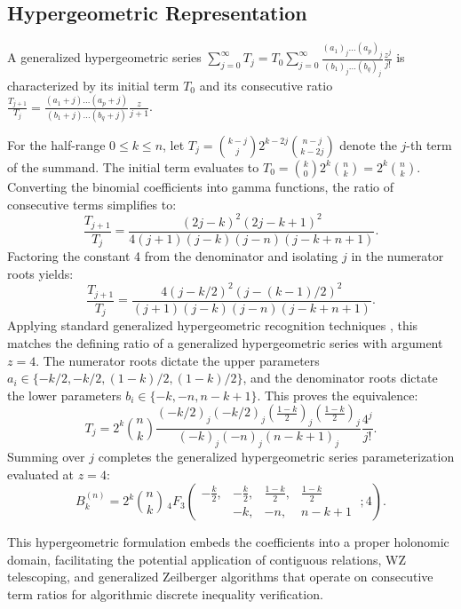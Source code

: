 \documentclass[11pt]{article}
\begin{document}
\subsection{Hypergeometric Representation}

A generalized hypergeometric series $\sum_{j=0}^\infty T_j = T_0 \sum_{j=0}^\infty \frac{(a_1)_j \dots (a_p)_j}{(b_1)_j \dots (b_q)_j} \frac{z^j}{j!}$ is characterized by its initial term $T_0$ and its consecutive ratio $\frac{T_{j+1}}{T_j} = \frac{(a_1+j)\dots(a_p+j)}{(b_1+j)\dots(b_q+j)}\frac{z}{j+1}$.

For the half-range $0 \le k \le n$, let $T_j = \binom{k-j}{j} 2^{k-2j} \binom{n-j}{k-2j}$ denote the $j$-th term of the summand. The initial term evaluates to $T_0 = \binom{k}{0} 2^k \binom{n}{k} = 2^k \binom{n}{k}$. Converting the binomial coefficients into gamma functions, the ratio of consecutive terms simplifies to:
\begin{equation*}
\frac{T_{j+1}}{T_j} = \frac{(2j-k)^2(2j-k+1)^2}{4(j+1)(j-k)(j-n)(j-k+n+1)}.
\end{equation*}
Factoring the constant 4 from the denominator and isolating $j$ in the numerator roots yields:
\begin{equation*}
\frac{T_{j+1}}{T_j} = \frac{4(j - k/2)^2 (j - (k-1)/2)^2}{(j+1)(j-k)(j-n)(j-k+n+1)}.
\end{equation*}
Applying standard generalized hypergeometric recognition techniques \cite{Slater1966, Petkovsek1996}, this matches the defining ratio of a generalized hypergeometric series with argument $z=4$. The numerator roots dictate the upper parameters $a_i \in \{-k/2, -k/2, (1-k)/2, (1-k)/2\}$, and the denominator roots dictate the lower parameters $b_i \in \{-k, -n, n-k+1\}$. This proves the equivalence:
\begin{equation*}
T_j = 2^k \binom{n}{k} \frac{(-k/2)_j (-k/2)_j (\frac{1-k}{2})_j (\frac{1-k}{2})_j}{(-k)_j (-n)_j (n-k+1)_j} \frac{4^j}{j!}.
\end{equation*}
Summing over $j$ completes the generalized hypergeometric series parameterization evaluated at $z=4$:
\begin{equation}
B_k^{(n)} = 2^k\binom{n}{k} \, {}_4F_3\left( 
\begin{matrix}
-\frac{k}{2}, & -\frac{k}{2}, & \frac{1-k}{2}, & \frac{1-k}{2} \\
 & -k, & -n, & n-k+1
\end{matrix}
\;; 4 \right).
\end{equation}

This hypergeometric formulation embeds the coefficients into a proper holonomic domain, facilitating the potential application of contiguous relations, WZ telescoping, and generalized Zeilberger algorithms that operate on consecutive term ratios for algorithmic discrete inequality verification.
\end{document}
